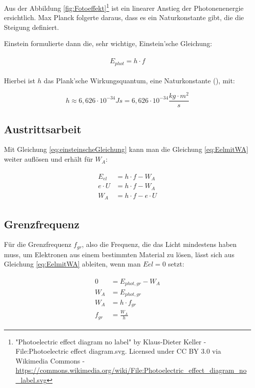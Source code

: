 Aus der Abbildung \ref{fig:Fotoeffekt}\footnote{"Photoelectric effect diagram no label" by Klaus-Dieter Keller - File:Photoelectric effect diagram.svg. Licensed under CC BY 3.0 via Wikimedia Commons - \url{https://commons.wikimedia.org/wiki/File:Photoelectric_effect_diagram_no_label.svg}} ist ein linearer Anstieg der Photonenenergie ersichtlich. Max Planck folgerte daraus, dass es ein Naturkonstante gibt, die die Steigung definiert.

Einstein formulierte dann die, sehr wichtige, Einstein'sche Gleichung:

\begin{align}	\label{eq:einsteinscheGleichung}
\begin{split}
	E_{phot} = h \cdot f
\end{split}
\end{align}

\noindent Hierbei ist $h$ das \glqq Plank'sche Wirkungsquantum\grqq , eine Naturkonstante (), mit:

\begin{equation}
	h \approx 6,626 \cdot 10^{-34} Js = 6,626 \cdot 10^{-34} \frac{kg \cdot m^2}{s}
\end{equation}


\subsection{Austrittsarbeit}

Mit Gleichung \ref{eq:einsteinscheGleichung} kann man die Gleichung \ref{eq:EelmitWA} weiter auflösen und erhält für $W_A$:

\begin{align} \label{eq:Austrittsarbeit}
\begin{split}
	E_{el} &= h \cdot f - W_A \\
	e \cdot U &= h \cdot f - W_A \\
	W_A &= h \cdot f - e \cdot U
\end{split}
\end{align}


\subsection{Grenzfrequenz}

Für die Grenzfrequenz $f_{gr}$, also die Frequenz, die das Licht mindestens haben muss, um Elektronen aus einem bestimmten Material zu lösen, lässt sich aus Gleichung \ref{eq:EelmitWA} ableiten, wenn man $E{el} = 0$ setzt:

\begin{align} \label{eq:Grenzfrequenz}
\begin{split}
	0 &= E_{phot,gr} - W_A \\
	W_A &= E_{phot,gr} \\
	W_A &= h \cdot f_{gr} \\
	f_{gr} &= \frac{W_A}{h}
\end{split}
\end{align}


